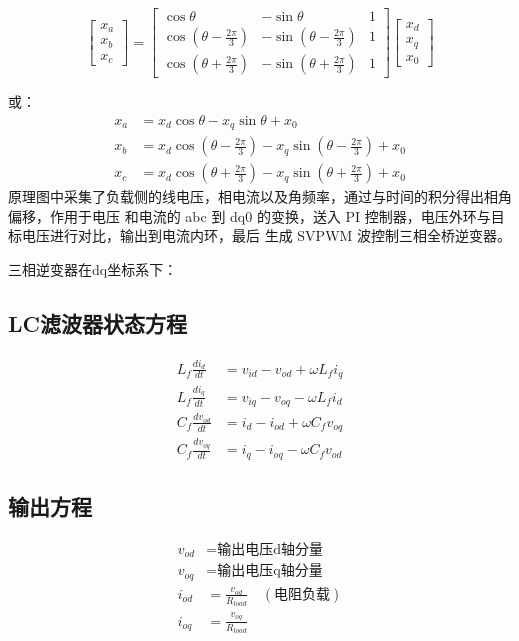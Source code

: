 \documentclass[11pt,a4paper]{article}
\begin{document}
\begin{equation}
\begin{bmatrix}
x_a \\
x_b \\
x_c
\end{bmatrix}
=
\begin{bmatrix}
\cos\theta & -\sin\theta & 1 \\
\cos\left(\theta - \frac{2\pi}{3}\right) & -\sin\left(\theta - \frac{2\pi}{3}\right) & 1 \\
\cos\left(\theta + \frac{2\pi}{3}\right) & -\sin\left(\theta + \frac{2\pi}{3}\right) & 1
\end{bmatrix}
\begin{bmatrix}
x_d \\
x_q \\
x_0
\end{bmatrix}
\end{equation}

或：
\begin{align}
x_a &= x_d \cos\theta - x_q \sin\theta + x_0 \\
x_b &= x_d \cos\left(\theta - \frac{2\pi}{3}\right) - x_q \sin\left(\theta - \frac{2\pi}{3}\right) + x_0 \\
x_c &= x_d \cos\left(\theta + \frac{2\pi}{3}\right) - x_q \sin\left(\theta + \frac{2\pi}{3}\right) + x_0
\end{align}
原理图中采集了负载侧的线电压，相电流以及角频率，通过与时间的积分得出相角偏移，作用于电压
和电流的 abc 到 dq0 的变换，送入 PI 控制器，电压外环与目标电压进行对比，输出到电流内环，最后
生成 SVPWM 波控制三相全桥逆变器。

三相逆变器在dq坐标系下：

\subsection{LC滤波器状态方程}
\begin{align}
L_f \frac{di_d}{dt} &= v_{id} - v_{od} + \omega L_f i_q \\
L_f \frac{di_q}{dt} &= v_{iq} - v_{oq} - \omega L_f i_d \\
C_f \frac{dv_{od}}{dt} &= i_d - i_{od} + \omega C_f v_{oq} \\
C_f \frac{dv_{oq}}{dt} &= i_q - i_{oq} - \omega C_f v_{od}
\end{align}

\subsection{输出方程}
\begin{align}
v_{od} &= \text{输出电压d轴分量} \\
v_{oq} &= \text{输出电压q轴分量} \\
i_{od} &= \frac{v_{od}}{R_{load}} \quad (\text{电阻负载}) \\
i_{oq} &= \frac{v_{oq}}{R_{load}}
\end{align}
\end{document}
